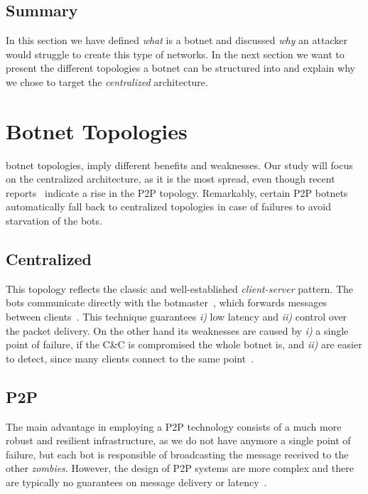 \subsection*{Summary} %
\label{sub:what_summary}
In this section we have defined \emph{what} is a botnet and discussed \emph{why}
an attacker would struggle to create this type of networks. In the next section
we want to present the different topologies a botnet can be structured into and
explain why we chose to target the \emph{centralized} architecture.



\section{Botnet Topologies} %
\label{sec:botnet_topologies}
 botnet topologies, imply different benefits and
weaknesses. Our study will focus on the centralized architecture, as it is
the most spread, even though recent reports~\cite{enisa2013} indicate a rise
in the P2P topology. Remarkably, certain P2P botnets automatically fall back to centralized topologies in case of failures to avoid  starvation of the bots.

\subsection{Centralized} %
\label{sub:centralized}
This topology reflects the classic  and well-established \emph{client-server}
pattern.
The bots communicate directly with the botmaster~\cite{schiavoni2013}, which forwards messages between clients~\cite{bailey2009}. This technique
guarantees \emph{i)} low latency and \emph{ii)} control over the packet delivery.
On the other hand its weaknesses are caused by \emph{i)} a single point of
failure, if the C\&C is compromised the whole botnet is, and \emph{ii)} are
easier to detect, since many clients connect to the same point~\cite{bailey2009}.

\subsection{P2P} %
\label{ssub:p2p}
The main advantage in employing a P2P technology consists of a much more robust
and resilient infrastructure, as we do not have anymore a single point of
failure, but each bot is responsible of broadcasting the message received to
the other \emph{zombies}.
However, the design of P2P systems are more complex and there are typically no
guarantees on message delivery or latency~\cite{bailey2009}.

